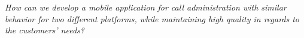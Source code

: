 \textit{How can we develop a mobile application for call administration with similar behavior for two different platforms, while maintaining high quality in regards to the customers' needs?}